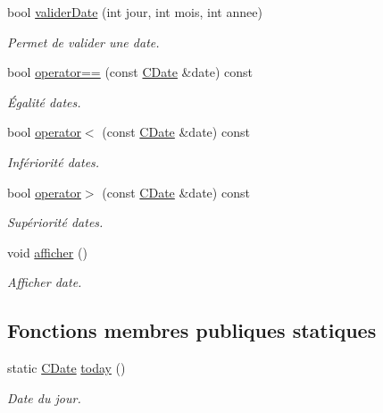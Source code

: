\begin{DoxyCompactItemize}
bool \hyperlink{class_c_date_a45a71c91bd790e7b84405c8128e4094b}{validerDate} (int jour, int mois, int annee)
\begin{DoxyCompactList}\small\item\em Permet de valider une date. \item\end{DoxyCompactList}\item 
bool \hyperlink{class_c_date_a82e5b049e86145b62893f194b5638ad6}{operator==} (const \hyperlink{class_c_date}{CDate} \&date) const 
\begin{DoxyCompactList}\small\item\em Égalité dates. \item\end{DoxyCompactList}\item 
bool \hyperlink{class_c_date_a2764c65e43a4ee956cd16f8ce242dbc7}{operator$<$} (const \hyperlink{class_c_date}{CDate} \&date) const 
\begin{DoxyCompactList}\small\item\em Infériorité dates. \item\end{DoxyCompactList}\item 
bool \hyperlink{class_c_date_ac653ba135b3681a64448872b2d6a0c17}{operator$>$} (const \hyperlink{class_c_date}{CDate} \&date) const 
\begin{DoxyCompactList}\small\item\em Supériorité dates. \item\end{DoxyCompactList}\item 
void \hyperlink{class_c_date_a9b58a7c96cf53352328906e30891e4e4}{afficher} ()
\begin{DoxyCompactList}\small\item\em Afficher date. \item\end{DoxyCompactList}\end{DoxyCompactItemize}
\subsection*{Fonctions membres publiques statiques}
\begin{DoxyCompactItemize}
\item 
static \hyperlink{class_c_date}{CDate} \hyperlink{class_c_date_a5367206ed910298afbf1bf57efe47c92}{today} ()
\begin{DoxyCompactList}\small\item\em Date du jour. \item\end{DoxyCompactList}\end{DoxyCompactItemize}


